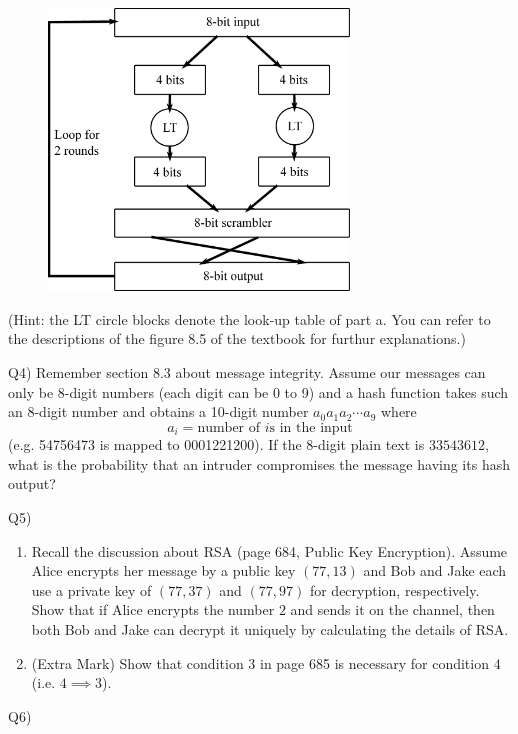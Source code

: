 \documentclass[10pt,letterpaper]{article}
\begin{document}
\begin{figure}[htbp]
\centering
\includegraphics[width=80mm]{block_cipher.eps}
\end{figure}

(Hint: the LT circle blocks denote the look-up table of part a. You can refer to the descriptions of the figure 8.5 of the textbook for furthur explanations.)

Q4) Remember section 8.3 about message integrity. Assume our messages can only be 8-digit numbers (each digit can be 0 to 9) and a hash function takes such an 8-digit number and obtains a 10-digit number $a_0a_1a_2\cdots a_9$ where $$a_i=\text{number of }i\text{s in the input}$$
(e.g. 54756473 is mapped to 0001221200). If the 8-digit plain text is $33543612$, what is the probability that an intruder compromises the message having its hash output?

Q5) 

\begin{enumerate}[label=\alph*-]
\item
Recall the discussion about RSA (page 684, Public Key Encryption). Assume Alice encrypts her message by a public key $(77,13)$ and Bob and Jake each use a private key of $(77,37)$ and $(77,97)$ for decryption, respectively. Show that if Alice encrypts the number $2$ and sends it on the channel, then both Bob and Jake can decrypt it uniquely by calculating the details of RSA.
\item
(Extra Mark) Show that condition 3 in page 685 is necessary for condition $4$ (i.e. $4\implies 3$).
\end{enumerate}

Q6)
\end{document}
